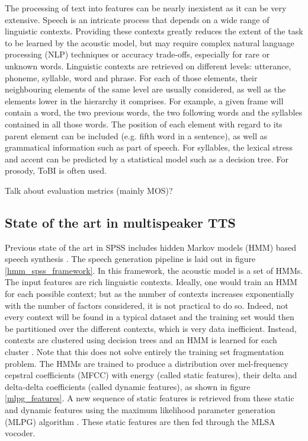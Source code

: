 \documentclass[a4paper, oneside]{article}
\begin{document}
The processing of text into features can be nearly inexistent as it can be very extensive. Speech is an intricate process that depends on a wide range of linguistic contexts. Providing these contexts greatly reduces the extent of the task to be learned by the acoustic model, but may require complex natural language processing (NLP) techniques or accuracy trade-offs, especially for rare or unknown words. Linguistic contexts are retrieved on different levels: utterance, phoneme, syllable, word and phrase. For each of those elements, their neighbouring elements of the same level are usually considered, as well as the elements lower in the hierarchy it comprises. For example, a given frame will contain a word, the two previous words, the two following words and the syllables contained in all those words. The position of each element with regard to its parent element can be included (e.g. fifth word in a sentence), as well as grammatical information such as part of speech. For syllables, the lexical stress and accent can be predicted by a statistical model such as a decision tree. For prosody, ToBI \cite{TOBI} is often used.

\color{red}Talk about evaluation metrics (mainly MOS)?\color{black}

\subsection{State of the art in multispeaker TTS}
Previous state of the art in SPSS includes hidden Markov models (HMM) based speech synthesis \cite{Tokuda-2013}. The speech generation pipeline is laid out in figure \ref{hmm_spss_framework}. In this framework, the acoustic model is a set of HMMs. The input features are rich linguistic contexts. Ideally, one would train an HMM for each possible context; but as the number of contexts increases exponentially with the number of factors considered, it is not practical to do so. Indeed, not every context will be found in a typical dataset and the training set would then be partitioned over the different contexts, which is very data inefficient. Instead, contexts are clustered using decision trees and an HMM is learned for each cluster \cite{HMMTTS}. Note that this does not solve entirely the training set fragmentation problem. The HMMs are trained to produce a distribution over mel-frequency cepstral coefficients (MFCC) with energy (called static features), their delta and delta-delta coefficients (called dynamic features), as shown in figure \ref{mlpg_features}. A new sequence of static features is retrieved from these static and dynamic features using the maximum likelihood parameter generation (MLPG) algorithm \cite{Tokuda-2000}. These static features are then fed through the MLSA \cite{MLSA} vocoder. 
\end{document}
